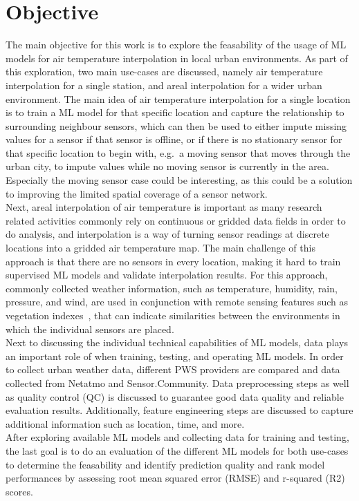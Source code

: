 \section{Objective}

The main objective for this work is to explore the feasability of the usage of ML models for air temperature interpolation in local urban environments. As part of this exploration, two main use-cases are discussed, namely air temperature interpolation for a single station, and areal interpolation for a wider urban environment. The main idea of air temperature interpolation for a single location is to train a ML model for that specific location and capture the relationship to surrounding neighbour sensors, which can then be used to either impute missing values for a sensor if that sensor is offline, or if there is no stationary sensor for that specific location to begin with, e.g.\ a moving sensor that moves through the urban city, to impute values while no moving sensor is currently in the area. Especially the moving sensor case could be interesting, as this could be a solution to improving the limited spatial coverage of a sensor network.\\
Next, areal interpolation of air temperature is important as many research related activities commonly rely on continuous or gridded data fields in order to do analysis, and interpolation is a way of turning sensor readings at discrete locations into a gridded air temperature map. The main challenge of this approach is that there are no sensors in every location, making it hard to train supervised ML models and validate interpolation results. For this approach, commonly collected weather information, such as temperature, humidity, rain, pressure, and wind, are used in conjunction with remote sensing features such as vegetation indexes~\cite{alonso2020new}, that can indicate similarities between the environments in which the individual sensors are placed.\\
Next to discussing the individual technical capabilities of ML models, data plays an important role of when training, testing, and operating ML models. In order to collect urban weather data, different PWS providers are compared and data collected from Netatmo and Sensor.Community. Data preprocessing steps as well as quality control (QC) is discussed to guarantee good data quality and reliable evaluation results. Additionally, feature engineering steps are discussed to capture additional information such as location, time, and more.\\
After exploring available ML models and collecting data for training and testing, the last goal is to do an evaluation of the different ML models for both use-cases to determine the feasability and identify prediction quality and rank model performances by assessing root mean squared error (RMSE) and r-squared (R2) scores.

